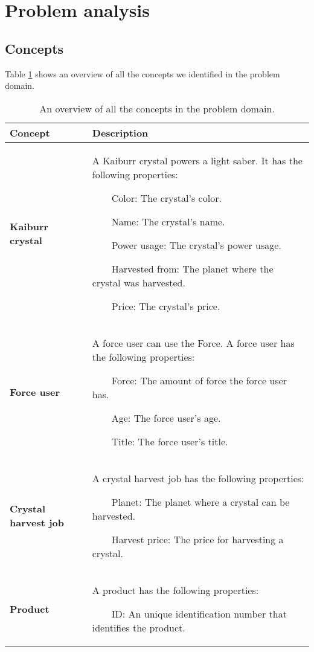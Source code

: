 \documentclass[a4paper]{article}
\newcommand{\tabitem}{~~\llap{\textbullet}~~}
\begin{document}
\pagestyle{fancy}

\section{Problem analysis}

\subsection{Concepts}
Table \ref{table:1} shows an overview of all the concepts we identified in the problem domain.

\begin{table}
	\centering
	\caption{An overview of all the concepts in the problem domain.}
	\label{table:1}
	\begin{tabular}{|p{3cm}|p{8.5cm}|} \hline
		\textbf{Concept} & \textbf{Description} \\ \hline
		
		\textbf{Kaiburr crystal} & A Kaiburr crystal powers a light saber. It has the following properties:
		
			\tabitem Color: The crystal's color.
			
			\tabitem Name: The crystal's name.
			
			\tabitem Power usage: The crystal's power usage.
			
			\tabitem Harvested from: The planet where the crystal was harvested.
			
			\tabitem Price: The crystal's price. \\ \hline
		
		\textbf{Force user} & A force user can use the Force. A force user has the following properties:
		
			\tabitem Force: The amount of force the force user has.
			
			\tabitem Age: The force user's age.
			
			\tabitem Title: The force user's title.\\ \hline
		
		\textbf{Crystal harvest job} & A crystal harvest job has the following properties:
		
			\tabitem Planet: The planet where a crystal can be harvested.
			
			\tabitem Harvest price: The price for harvesting a crystal.\\ \hline
		
		\textbf{Product} & A product has the following properties:
		
			\tabitem ID: An unique identification number that identifies the product.
			

\end{tabular}
\end{table}
\end{document}
